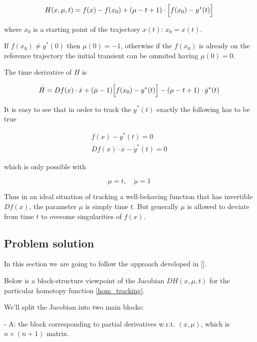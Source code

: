 \documentclass[11pt,american]{article}
\begin{document}
\begin{equation}\label{hom_tracking}
H(x,\mu, t) = f(x) - f(x_0) + (\mu - t + 1) \cdot \Bigl[ f(x_0) - y^*(t) \Bigr] 
\end{equation}

where $x_0$ is a starting point of the trajectory $x(t)$: $x_0=x(t)$.

If $f(x_0) \ne y^*(0)$ then $\mu(0) = -1$, otherwise if the $f(x_0)$ is already on the reference trajectory the initial transient can be ommited having $\mu(0)=0$.

The time derivative of $H$ is

\begin{equation}\label{diff_hom_tracking}
\dot H = D f(x) \cdot \dot x + (\dot {\mu} - 1)\Bigl[ f(x_0) - y^*(t) \Bigr] - (\mu - t + 1) \cdot \dot y^*(t)
\end{equation}

It is easy to see that in order to track the $y^*(t)$ exactly the following has to be true 

\begin{gather}
f(x) - y^*(t) = 0 \\
D f(x) \cdot \dot x - \dot y^*(t) = 0
\end{gather}

which is only possible with

\begin{equation}\label{tracking_conditions}
\mu = t, \quad \dot {\mu} = 1
\end{equation}

Thus in an ideal situation of tracking a well-behaving function that has invertible $D f(x)$, the parameter $\mu$ is simply time $t$.
But generally $\mu$ is allowed to deviate from time $t$ to ovecome singularities of $f(x)$.

\subsection{Problem solution}

In this section we are going to follow the approach developed in [].

Below is a block-structure viewpoint of the Jacobian $D H(x,\mu,t)$ for the particular homotopy function \eqref{hom_tracking}.

We'll split the Jacobian into two main blocks:  

- A: the block corresponding to partial derivatives w.r.t. $(x,\mu)$, which is $n \times (n+1)$ matrix.  
\end{document}
